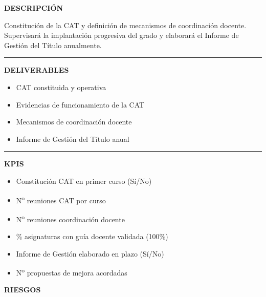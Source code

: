 \documentclass[11pt,a4paper]{scrreprt}
\newcommand{\fieldlabel}[1]{%
  {\footnotesize\sffamily\bfseries\color{mutedcolor}\MakeUppercase{#1}}\par\nopagebreak[4]
}
\newcommand{\fieldsep}{\vspace{3pt}\noindent\textcolor{bordercolor}{\rule{\linewidth}{0.4pt}}\vspace{3pt}\par}
\begin{document}
\begin{tcolorbox}[pabox={aacolor}{PA2.1 \enspace\textbullet\enspace Activación de la gestión académica del Grado en Empresa y Tecnología Digital}]

\fieldlabel{Descripci\'on}
{\small Constitución de la CAT y definición de mecanismos de coordinación docente. Supervisará la implantación progresiva del grado y elaborará el Informe de Gestión del Título anualmente.}\par
\fieldsep
\fieldlabel{Deliverables}
{\small \begin{itemize}[noitemsep,topsep=2pt]
\item CAT constituida y operativa
\item Evidencias de funcionamiento de la CAT
\item Mecanismos de coordinación docente
\item Informe de Gestión del Título anual
\end{itemize}}\par
\fieldsep
\fieldlabel{KPIs}
{\small \begin{itemize}[noitemsep,topsep=2pt]
\item Constitución CAT en primer curso (Sí/No)
\item N\textsuperscript{o} reuniones CAT por curso
\item N\textsuperscript{o} reuniones coordinación docente
\item \% asignaturas con guía docente validada (100\%)
\item Informe de Gestión elaborado en plazo (Sí/No)
\item N\textsuperscript{o} propuestas de mejora acordadas
\end{itemize}}\par
\end{tcolorbox}
\begin{tcolorbox}[riskbox]
{\footnotesize\sffamily\bfseries\color{red!50!black} RIESGOS}\par{}
\end{tcolorbox}
\end{document}
